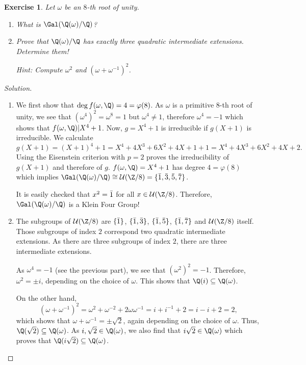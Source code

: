 \documentclass[a4paper,10pt,reqno]{amsart}
\newtheorem{ex}{Exercise}[section]
\newenvironment{sol}
  {\renewcommand\qedsymbol{$\blacksquare$}\begin{proof}[Solution]}
  {\end{proof}}
\begin{document}
\begin{ex}
\label{11.4}
    Let $\omega$ be an $8$-th root of unity.
    \begin{enumerate}[label=(\roman*)]
    \item What is $\Gal(\Q(\omega)/\Q)$?
    
    \item Prove that $\Q(\omega)/\Q$ has exactly \emph{three} quadratic intermediate extensions. Determine them!

    \noindent \textit{Hint:} Compute $\omega^2$ and $(\omega + \omega^{-1})^2$.
\end{enumerate}
\end{ex}
\begin{sol}
\begin{enumerate}[label=(\roman*)]
\item We first show that $\deg f(\omega,\Q) = 4 = \varphi(8)$. As $\omega$ is a primitive $8$-th root of unity, we see that $(\omega^4)^2 = \omega^8 = 1$ but $\omega^4 \neq 1$, therefore $\omega^4 = -1$ which shows that $f(\omega,\Q) | X^4 + 1$. Now, $g = X^4+1$ is irreducible if $g(X+1)$ is irreducible. We calculate
\[
g(X+1) = (X +1)^4 +1 = X^4 + 4X^3 + 6X^2 + 4X + 1 + 1 = X^4 + 4X^3 + 6X^2 + 4X + 2.
\]
Using the Eisenstein criterion with $p=2$ proves the irreducibility of $g(X+1)$ and therefore of $g$. $f(\omega,\Q) = X^4 + 1$ has degree $4 = \varphi(8)$ which implies $\Gal(\Q(\omega)/\Q) \cong \mathcal{U}(\Z/8) = \{ \Bar{1},\Bar{3}, \Bar{5}, \Bar{7}\}$.

It is easily checked that $x^2 = \Bar{1}$ for all $x \in \mathcal{U}(\Z/8)$. Therefore, $\Gal(\Q(\omega)/\Q)$ is a Klein Four Group!
\item The subgroups of $\mathcal{U}(\Z/8)$ are $\{ \Bar{1} \}$, $\{ \Bar{1}, \Bar{3} \}$, $\{ \Bar{1}, \Bar{5} \}$, $\{ \Bar{1}, \Bar{7} \}$ and $\mathcal{U}(\Z/8)$ itself. Those subgroups of index $2$ correspond two quadratic intermediate extensions. As there are three subgroups of index $2$, there are three intermediate extensions.

As $\omega^4 = - 1$ (see the previous part), we see that $(\omega^2)^2 = -1$. Therefore, $\omega^2 = \pm i$, depending on the choice of $\omega$. This shows that $\Q(i) \subseteq \Q(\omega)$.

On the other hand,
\[
(\omega + \omega^{-1})^2 = \omega^2 + \omega^{-2} + 2\omega \omega^{-1} = i + i^{-1} + 2 = i - i + 2 = 2,
\]
which shows that $\omega + \omega^{-1} = \pm \sqrt{2}$, again depending on the choice of $\omega$. Thus, $\Q(\sqrt{2}) \subseteq \Q(\omega)$. As $i, \sqrt{2} \in \Q(\omega)$, we also find that $i \sqrt{2} \in \Q(\omega)$ which proves that $\Q(i \sqrt{2}) \subseteq \Q(\omega)$.\qedhere
\end{enumerate}
\end{sol}
\end{document}
